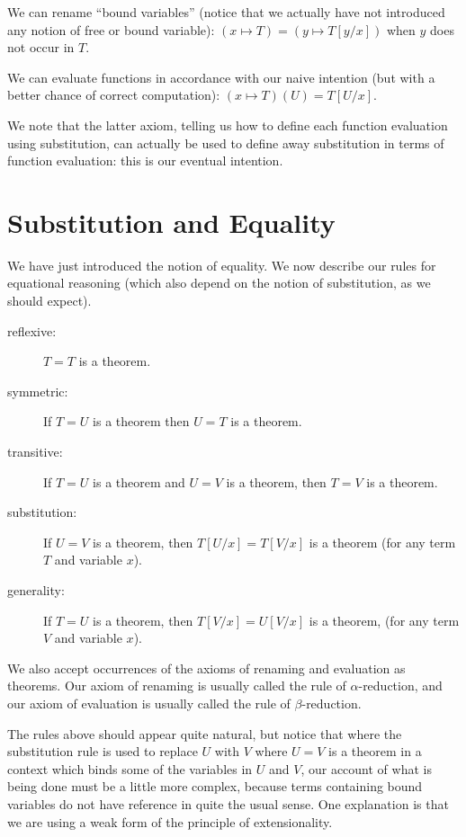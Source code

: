 \documentclass{article}
\begin{document}
We can rename ``bound variables'' (notice that we actually have not introduced
any notion of free or bound variable):  $(x \mapsto T) = (y \mapsto T[y/x])$
when $y$ does not occur in $T$.

We can evaluate functions in accordance with our naive intention (but with
a better chance of correct computation):  $(x \mapsto T)(U) = T[U/x]$.

We note that the latter axiom, telling us how to define each function
evaluation using substitution, can actually be used to define away
substitution in terms of function evaluation: this is our eventual
intention.

\section{Substitution and Equality}

We have just introduced the notion of equality.  We now describe our
rules for equational reasoning (which also depend on the notion of
substitution, as we should expect).

\begin{description}

\item[reflexive:]  $T=T$ is a theorem.

\item[symmetric:]  If $T=U$ is a theorem then $U=T$ is a theorem.

\item[transitive:] If $T=U$ is a theorem and $U=V$ is a theorem, then
$T=V$ is a theorem.

\item[substitution:] If $U=V$ is a theorem, then $T[U/x]=T[V/x]$ is a
theorem (for any term $T$ and variable $x$).

\item[generality:]  If $T=U$ is a theorem, then $T[V/x]=U[V/x]$ is a theorem,
(for any term $V$ and variable $x$).

\end{description}

We also accept occurrences of the axioms of renaming and evaluation as
theorems.  Our axiom of renaming is usually called the rule of
$\alpha$-reduction, and our axiom of evaluation is usually called the
rule of $\beta$-reduction.

The rules above should appear quite natural, but notice that where the
substitution rule is used to replace $U$ with $V$ where $U=V$ is a
theorem in a context which binds some of the variables in $U$ and $V$,
our account of what is being done must be a little more complex,
because terms containing bound variables do not have reference in
quite the usual sense.  One explanation is that we are using a weak form
of the principle of extensionality.
\end{document}
